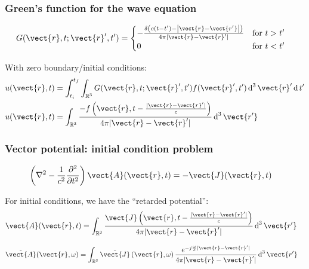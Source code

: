 \documentclass[12 pt, compress, handout, intlimits]{beamer}
\renewcommand{\d}{\operatorname{d}}
\newcommand{\ft}[1]{\tilde{#1}}
\begin{document}
\begin{frame}[fragile]
    \frametitle{Green's function for the wave equation}
    
    \begin{align*}
    G(\vect{r}, t; \vect{r}', t') &= \begin{cases} - \frac{\delta\left( c(t - t') - \left| \vect{r} - \vect{r'} \right| \right)}{4 \pi \left| \vect{r} - \vect{r}' \right|} & \text{for } t > t' \\ 0 & \text{for } t < t' \end{cases}
    \end{align*}

    With zero boundary/initial conditions:
    \begin{align*}
        u(\vect{r}, t) &= \int_{t_i}^{t_f} \int_{\mathbb{R}^3} G(\vect{r}, t; \vect{r}', t') f(\vect{r}', t') \d^3 \vect{r}' \d t'
        \\
        u(\vect{r}, t) &= \int_{\mathbb{R}^3} \frac{-f\left(\vect{r}, t - \frac{|\vect{r} - \vect{r}'|}{c}\right)}{4 \pi |\vect{r} - \vect{r}'|} \d^3 \vect{r'}
    \end{align*}
    
\end{frame}

\note{}

\begin{frame}[fragile]
    \frametitle{Vector potential: initial condition problem}
    
    \begin{align*}
        \left( \nabla^2 - \frac{1}{c^2} \frac{\partial^2}{\partial t^2} \right) \vect{A}(\vect{r}, t) &= - \vect{J}(\vect{r}, t)
    \end{align*}
    
    For initial conditions, we have the ``retarded potential'':
    \begin{align*}
        \vect{A}(\vect{r}, t) &= \int_{\mathbb{R}^3} \frac{\vect{J}\left(\vect{r}, t - \frac{|\vect{r} - \vect{r}'|}{c}\right)}{4 \pi |\vect{r} - \vect{r}'|} \d^3 \vect{r'}
    \end{align*}

    \begin{align*}
        \ft{\vect{A}}(\vect{r}, \omega) &= \int_{\mathbb{R}^3} \ft{\vect{J}}\left(\vect{r}, \omega \right) \frac{e^{- j \frac{\omega}{c} | \vect{r} - \vect{r}' |}}{4 \pi |\vect{r} - \vect{r}'|} \d^3 \vect{r'}
    \end{align*}
    
    
\end{frame}
\end{document}
